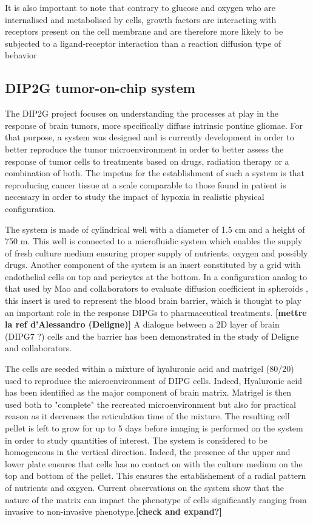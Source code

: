 \documentclass[11pt,a4paper]{article}
\begin{document}
It is also important to note that contrary to glucose and oxygen who are internalised and metabolised by cells, growth factors are interacting with receptors present on the cell membrane and are therefore more likely to be subjected to  a ligand-receptor interaction than a reaction diffusion type of behavior

\subsection{DIP2G tumor-on-chip system}
The DIP2G project focuses on understanding the processes at play in the response of brain tumors, more specifically diffuse intrinsic pontine gliomae. For that purpose, a system was designed and is currently development in order to better reproduce the tumor microenvironment in order to better assess the response of tumor cells to treatments based on drugs, radiation therapy or a combination of both. The impetus for the establishment of such a system is that reproducing cancer tissue at a scale comparable to those found in patient is necessary in order to study the impact of hypoxia in realistic physical configuration.

The system is made of cylindrical well with a diameter of 1.5 cm and a height of 750 \textmu m. This well is connected to a microfluidic system which enables the supply of fresh culture medium ensuring proper supply of nutrients, oxygen and possibly drugs. Another component of the system is an insert constituted by a grid with endothelial cells on top and pericytes at the bottom. In a configuration analog to that used by Mao and collaborators to evaluate diffusion coefficient in spheroids \cite{Mao2018}, this insert is used to represent the blood brain barrier, which is thought to play an important role in the response DIPGs to pharmaceutical treatments. \textbf{[mettre la ref d'Alessandro (Deligne)]} A dialogue between a 2D layer of brain (DIPG7 ?) cells and the barrier has been demonstrated in the study of Deligne and collaborators.

The cells are seeded within a mixture of hyaluronic acid and matrigel (80/20) used to reproduce the microenvironment of DIPG cells. Indeed, Hyaluronic acid has been identified as the major component of brain matrix. Matrigel is then used both to "complete" the recreated microenvironment but also for practical reason as it decreases the reticulation time of the mixture. The resulting cell pellet is left to grow for up to 5 days before imaging is performed on the system in order to study quantities of interest. The system is considered to be homogeneous in the vertical direction. Indeed, the presence of the upper and lower plate ensures that cells has no contact on with the culture medium on the top and bottom of the pellet. This ensures the establishement of a radial pattern of nutrients and oxgyen. Current observations on the system show that the nature of the matrix can impact the phenotype of cells significantly ranging from invasive to non-invasive phenotype.\textbf{[check and expand?]}
\end{document}
